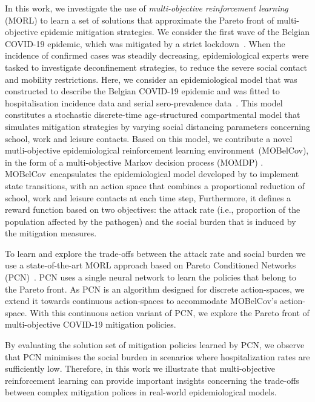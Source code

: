 \documentclass{article}
\renewcommand{\cite}[1]{\citep{#1}}
\newcommand{\momdpname}{MOBelCov}
\begin{document}
In this work, we investigate the use of \emph{multi-objective reinforcement learning} (MORL) to learn a set of solutions that approximate the Pareto front of multi-objective epidemic mitigation strategies. We consider the first wave of the Belgian COVID-19 epidemic, which was mitigated by a strict lockdown~\cite{willem2021impact}. When the incidence of confirmed cases was steadily decreasing, epidemiological experts were tasked to investigate deconfinement strategies, to reduce the severe social contact and mobility restrictions.
Here, we consider an epidemiological model that was constructed to describe the Belgian COVID-19 epidemic and was fitted to hospitalisation incidence data and serial sero-prevalence data~\cite{abrams2021modelling}.
This model constitutes a stochastic discrete-time age-structured compartmental model that simulates mitigation strategies by varying social distancing parameters concerning school, work and leisure contacts.  
Based on this model, we contribute a novel mutli-objective epidemiological reinforcement learning environment~(\momdpname), in the form of a multi-objective Markov decision process (MOMDP) \cite{roijers2013survey}. \momdpname\ encapsulates the epidemiological model developed by \citet{abrams2021modelling} to implement state transitions, with an action space that combines a proportional reduction of school, work and leisure contacts at each time step, Furthermore, it defines a reward function based on two objectives: the attack rate (i.e., proportion of the population affected by the pathogen) and the social burden that is induced by the mitigation measures.

To learn and explore the trade-offs between the attack rate and social burden we use a state-of-the-art MORL approach based on Pareto Conditioned Networks (PCN)~\cite{reymond2022pcn}. PCN uses a single neural network to learn the policies that belong to the Pareto front.
As PCN is an algorithm designed for discrete action-spaces, we extend it towards continuous action-spaces to accommodate \momdpname's action-space. With this continuous action variant of PCN, we explore the Pareto front of multi-objective COVID-19 mitigation policies.  

By evaluating the solution set of mitigation policies learned by PCN, we observe that PCN minimises the social burden in scenarios where hospitalization rates are sufficiently low. Therefore, in this work we illustrate that multi-objective reinforcement learning can provide important insights concerning the trade-offs between complex mitigation polices in real-world epidemiological models.
\end{document}
